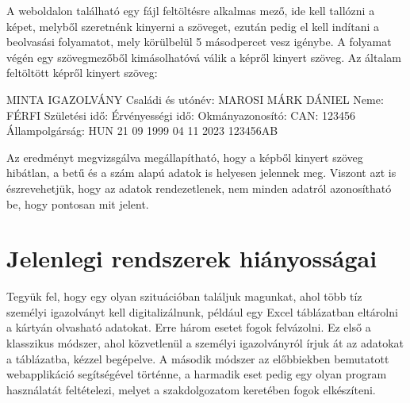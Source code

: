 \documentclass[12pt]{report}
\begin{document}
A weboldalon található egy fájl feltöltésre alkalmas mező, ide kell tallózni a képet, melyből szeretnénk kinyerni a szöveget, ezután pedig el kell indítani a beolvasási folyamatot, mely körülbelül 5 másodpercet vesz igénybe. A folyamat végén egy szövegmezőből kimásolhatóvá válik a képről kinyert szöveg. Az általam feltöltött képről kinyert szöveg:
\newline
\begin{tcolorbox}
MINTA IGAZOLVÁNY Családi és utónév: MAROSI MÁRK DÁNIEL Neme: FÉRFI Születési idő: Érvényességi idő: Okmányazonosító: CAN: 123456 Állampolgárság: HUN 21 09 1999 04 11 2023 123456AB
\end{tcolorbox}
\newline
Az eredményt megvizsgálva megállapítható, hogy a képből kinyert szöveg hibátlan, a betű és a szám alapú adatok is helyesen jelennek meg. Viszont azt is észrevehetjük, hogy az adatok rendezetlenek, nem minden adatról azonosítható be, hogy pontosan mit jelent.

\section{Jelenlegi rendszerek hiányosságai}

Tegyük fel, hogy egy olyan szituációban találjuk magunkat, ahol több tíz személyi igazolványt kell digitalizálnunk, például egy Excel táblázatban eltárolni a kártyán olvasható adatokat. Erre három esetet fogok felvázolni. Ez első a klasszikus módszer, ahol közvetlenül a személyi igazolványról írjuk át az adatokat a táblázatba, kézzel begépelve. A második módszer az előbbiekben bemutatott webapplikáció segítségével történne, a harmadik eset pedig egy olyan program használatát feltételezi, melyet a szakdolgozatom keretében fogok elkészíteni.
\end{document}
